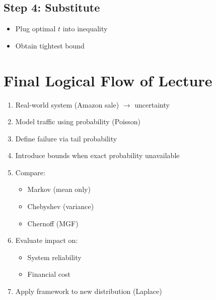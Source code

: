 \documentclass[11pt]{article}
\begin{document}
\subsection{Step 4: Substitute}

\begin{itemize}
\item Plug optimal $t$ into inequality
\item Obtain tightest bound
\end{itemize}

\section{Final Logical Flow of Lecture}

\begin{enumerate}
\item Real-world system (Amazon sale) $\rightarrow$ uncertainty
\item Model traffic using probability (Poisson)
\item Define failure via tail probability
\item Introduce bounds when exact probability unavailable
\item Compare:
\begin{itemize}
\item Markov (mean only)
\item Chebyshev (variance)
\item Chernoff (MGF)
\end{itemize}
\item Evaluate impact on:
\begin{itemize}
\item System reliability
\item Financial cost
\end{itemize}
\item Apply framework to new distribution (Laplace)
\end{enumerate}
\end{document}
